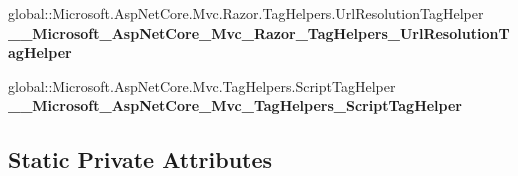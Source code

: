 \begin{DoxyCompactItemize}
global\+::\+Microsoft.\+Asp\+Net\+Core.\+Mvc.\+Razor.\+Tag\+Helpers.\+Url\+Resolution\+Tag\+Helper {\bfseries \+\_\+\+\_\+\+Microsoft\+\_\+\+Asp\+Net\+Core\+\_\+\+Mvc\+\_\+\+Razor\+\_\+\+Tag\+Helpers\+\_\+\+Url\+Resolution\+Tag\+Helper}
\item 
\mbox{\label{class_asp_net_core_1_1_views___shared_____validation_scripts_partial_ace4adf793b57c0adcf260cb9ebb8a273}} 
global\+::\+Microsoft.\+Asp\+Net\+Core.\+Mvc.\+Tag\+Helpers.\+Script\+Tag\+Helper {\bfseries \+\_\+\+\_\+\+Microsoft\+\_\+\+Asp\+Net\+Core\+\_\+\+Mvc\+\_\+\+Tag\+Helpers\+\_\+\+Script\+Tag\+Helper}
\end{DoxyCompactItemize}
\subsection*{Static Private Attributes}
